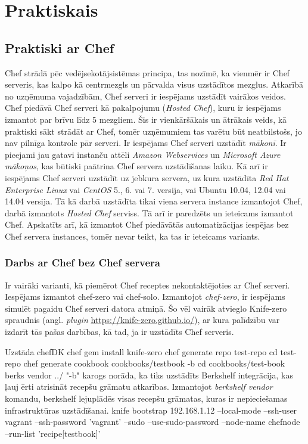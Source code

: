 \chapter{Praktiskais}
\section{Praktiski ar Chef}
Chef strādā pēc vedējsekotājsistēmas principa, tas nozīmē, ka vienmēr ir Chef serveris, kas kalpo kā centrmezgls un pārvalda visus uzstādītos mezglus. Atkarībā no uzņēmuma vajadzībām, Chef serveri ir iespējams uzstādīt vairākos veidos. Chef piedāvā Chef serveri kā pakalpojumu (\textit{Hosted Chef}), kuru ir iespējams izmantot par brīvu līdz 5 mezgliem. Šis ir vienkāršākais un ātrākais veids, kā praktiski sākt strādāt ar Chef, tomēr uzņēmumiem tas varētu būt neatbilstošs, jo nav pilnīga kontrole pār serveri. Ir iespējams Chef serveri uzstādīt \textit{mākonī}. Ir pieejami jau gatavi instanču attēli \textit{Amazon Webservices} un \textit{Microsoft Azure} \textit{mākoņos}, kas būtiski paātrina Chef servera uzstādīšanas laiku. Kā arī ir iespējams Chef serveri uzstādīt uz jebkura servera, uz kura uzstādīta \textit{Red Hat Enterprise Linux} vai \textit{CentOS} 5., 6. vai 7. versija, vai Ubuntu 10.04, 12.04 vai 14.04 versija.
Tā kā darbā uzstādīta tikai viena servera instance izmantojot Chef, darbā izmantots \textit{Hosted Chef} serviss. Tā arī ir paredzēts un ieteicams izmantot Chef.
Apskatīts arī, kā izmantot Chef piedāvātās automatizācijas iespējas bez Chef servera instances, tomēr nevar teikt, ka tas ir ieteicams variants.



\subsection{Darbs ar Chef bez Chef servera}
Ir vairāki varianti, kā piemērot Chef receptes nekontaktējoties ar Chef serveri. Iespējams izmantot chef-zero vai chef-solo.
Izmantojot \textit{chef-zero}, ir iespējams simulēt pagaidu Chef serveri datora atmiņā. Šo vēl vairāk atvieglo Knife-zero spraudnis (angl. \textit{plugin} \url{https://knife-zero.github.io/}), ar kura palīdzību var izdarīt tās pašas darbības, kā tad, ja ir uzstādīts Chef serveris.

Uzstāda chefDK
chef gem install knife-zero
chef generate repo test-repo
cd test-repo
chef generate cookbook cookbooks/testbook -b
cd cookbooks/test-book
berks vendor ../
"-b"  karogs norāda, ka tiks uzstādīts Berkshelf integrācija, kas ļauj ērti atrisināt recepšu grāmatu atkarības.
Izmantojot \textit{berkshelf vendor} komandu, berkshelf lejuplādēs visas recepšu grāmatas, kuras ir nepieciešamas infrastruktūras uzstādīšanai.
knife bootstrap 192.168.1.12 --local-mode --ssh-user vagrant --ssh-password 'vagrant' --sudo --use-sudo-password --node-name chefnode --run-list 'recipe[testbook]'

